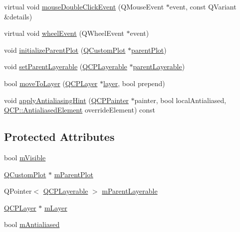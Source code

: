 \begin{DoxyCompactItemize}
virtual void \mbox{\hyperlink{class_q_c_p_layerable_a4171e2e823aca242dd0279f00ed2de81}{mouse\+Double\+Click\+Event}} (Q\+Mouse\+Event $\ast$event, const Q\+Variant \&details)
\item 
virtual void \mbox{\hyperlink{class_q_c_p_layerable_a47dfd7b8fd99c08ca54e09c362b6f022}{wheel\+Event}} (Q\+Wheel\+Event $\ast$event)
\item 
void \mbox{\hyperlink{class_q_c_p_layerable_a8cbe5a0c9a5674249982f5ca5f8e02bc}{initialize\+Parent\+Plot}} (\mbox{\hyperlink{class_q_custom_plot}{Q\+Custom\+Plot}} $\ast$\mbox{\hyperlink{class_q_c_p_layerable_a473edb813a4c1929d6b6a8fe3ff3faf7}{parent\+Plot}})
\item 
void \mbox{\hyperlink{class_q_c_p_layerable_aa23c893671f1f6744ac235cf2204cf3a}{set\+Parent\+Layerable}} (\mbox{\hyperlink{class_q_c_p_layerable}{Q\+C\+P\+Layerable}} $\ast$\mbox{\hyperlink{class_q_c_p_layerable_aa78b7e644d2c519e1a9a6f2ac5fcd858}{parent\+Layerable}})
\item 
bool \mbox{\hyperlink{class_q_c_p_layerable_af94484cfb7cbbddb7de522e9be71d9a4}{move\+To\+Layer}} (\mbox{\hyperlink{class_q_c_p_layer}{Q\+C\+P\+Layer}} $\ast$\mbox{\hyperlink{class_q_c_p_layerable_a5ff4862e8c784c9f5986dbc1533ba2a4}{layer}}, bool prepend)
\item 
void \mbox{\hyperlink{class_q_c_p_layerable_acb663e375d2d36dc5c55021ee5a2119b}{apply\+Antialiasing\+Hint}} (\mbox{\hyperlink{class_q_c_p_painter}{Q\+C\+P\+Painter}} $\ast$painter, bool local\+Antialiased, \mbox{\hyperlink{namespace_q_c_p_ae55dbe315d41fe80f29ba88100843a0c}{Q\+C\+P\+::\+Antialiased\+Element}} override\+Element) const
\end{DoxyCompactItemize}
\subsection*{Protected Attributes}
\begin{DoxyCompactItemize}
\item 
bool \mbox{\hyperlink{class_q_c_p_layerable_a62e3aed8427d6ce3ccf716f285106cb3}{m\+Visible}}
\item 
\mbox{\hyperlink{class_q_custom_plot}{Q\+Custom\+Plot}} $\ast$ \mbox{\hyperlink{class_q_c_p_layerable_aa2a528433e44db02b8aef23c1f9f90ed}{m\+Parent\+Plot}}
\item 
Q\+Pointer$<$ \mbox{\hyperlink{class_q_c_p_layerable}{Q\+C\+P\+Layerable}} $>$ \mbox{\hyperlink{class_q_c_p_layerable_a3291445a980053e2d17a21d15957624e}{m\+Parent\+Layerable}}
\item 
\mbox{\hyperlink{class_q_c_p_layer}{Q\+C\+P\+Layer}} $\ast$ \mbox{\hyperlink{class_q_c_p_layerable_aa38ec5891aff0f50b36fd63e9372a0cd}{m\+Layer}}
\item 
bool \mbox{\hyperlink{class_q_c_p_layerable_a3ab45a4c76a3333ce42eb217a81733ec}{m\+Antialiased}}
\end{DoxyCompactItemize}
